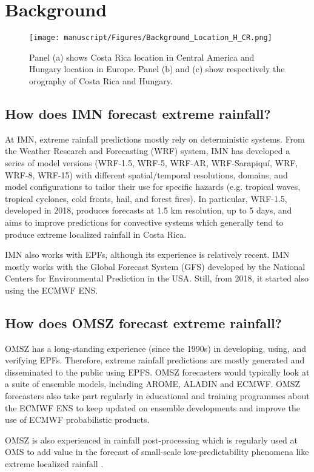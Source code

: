 
\section{Background}
\begin{figure}
\centerline{\texttt{[image: manuscript/Figures/Background\_Location\_H\_CR.png]}}
\caption{Panel (a) shows Costa Rica location in Central America and Hungary location in Europe. Panel (b) and (c) show respectively the orography of Costa Rica and Hungary.}
\label{GeoLocation_H_CR}
\end{figure}

\subsection{How does IMN forecast extreme rainfall?}
At IMN, extreme rainfall predictions mostly rely on deterministic systems. From the Weather Research and Forecasting (WRF) system, IMN has developed a series of model versions (WRF-1.5, WRF-5, WRF-AR, WRF-Sarapiquí, WRF, WRF-8, WRF-15) with different spatial/temporal resolutions, domains, and model configurations to tailor their use for specific hazards (e.g. tropical waves, tropical cyclones, cold fronts, hail, and forest fires). In particular, WRF-1.5, developed in 2018, produces forecasts at 1.5 km resolution, up to 5 days, and aims to improve predictions for convective systems which generally tend to produce extreme localized rainfall in Costa Rica.\par
IMN also works with EPFs, although its experience is relatively recent. IMN mostly works with the Global Forecast System (GFS) developed by the National Centers for Environmental Prediction in the USA. Still, from 2018, it started also using the ECMWF ENS.

\subsection{How does OMSZ forecast extreme rainfall?}
OMSZ has a long-standing experience (since the 1990s) in developing, using, and verifying EPFs. Therefore, extreme rainfall predictions are mostly generated and disseminated to the public using EPFS. OMSZ forecasters would typically look at a suite of ensemble models, including AROME, ALADIN and ECMWF. OMSZ forecasters also take part regularly in educational and training programmes about the ECMWF ENS to keep updated on ensemble developments and improve the use of ECMWF probabilistic products.\par
OMSZ is also experienced in rainfall post-processing which is regularly used at OMS to add value in the forecast of small-scale low-predictability phenomena like extreme localized rainfall \citep{Ihasz2018, Matrai2017}.



